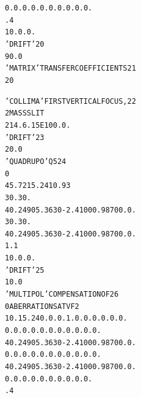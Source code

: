 \begin{tiny}
\begin{alltt}
   0. 0. 0. 0. 0. 0. 0. 0. 0. 0.                                                
     .4                                                                         
    1  0. 0. 0.                                                                 
   'DRIFT'                                                                20
     90.0                                                                       
   'MATRIX'                              TRANSFER  COEFFICIENTS           21
   2 0                                                                          
\end{alltt}
\newpage
\begin{alltt}
   'COLLIMA'                             FIRST  VERTICAL  FOCUS,          22
    2                                    MASS  SLIT                             
   2  14.6  .15E10  0. 0.                                                       
   'DRIFT'                                                                23
     20.0                                                                       
   'QUADRUPO'                            Q5                               24
   0                                                        
    45.72  15.24   10.93                                                        
    30. 30.                                                                     
    4    0.2490   5.3630  -2.4100   0.9870   0.   0.                            
    30. 30.                                                                     
    4    0.2490   5.3630  -2.4100   0.9870   0.   0.                            
   1.1                                                                          
    1  0. 0. 0.                                                                 
   'DRIFT'                                                                25
     10.0                                                                       
   'MULTIPOL'                            COMPENSATION  OF                 26
   0                                     ABERRATIONS  AT  VF2                   
    10.  15.24  0. 0.  0.  1.  0. 0. 0. 0. 0. 0.                                
    0. 0.  0. 0. 0. 0. 0. 0. 0. 0. 0.                                           
    4    0.2490   5.3630  -2.4100   0.9870   0.   0.                            
    0. 0.  0. 0. 0. 0. 0. 0. 0. 0. 0.                                           
    4    0.2490   5.3630  -2.4100   0.9870   0.   0.                            
   0. 0. 0. 0. 0. 0. 0. 0. 0. 0.                                                
    .4                                                                          

\end{alltt}
\end{tiny}
